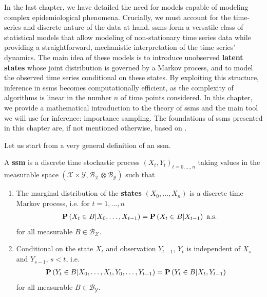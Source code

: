 In the last chapter, we have detailed the need for models capable of modeling complex epidemiological phenomena. Crucially, we must account for the time-series and discrete nature of the data at hand. 
\Glspl{ssm} form a versatile class of statistical models that allow modeling of non-stationary time series data while providing a straightforward, mechanistic interpretation of the time series' dynamics.
The main idea of these models is to introduce unobserved \textbf{latent states} whose joint distribution is governed by a Markov process, and to model the observed time series conditional on these states.
By exploiting this structure, inference in \glspl{ssm} becomes computationally efficient, as the complexity of algorithms is linear in the number $n$ of time points considered. 
In this chapter, we provide a mathematical introduction to the theory of \glspl{ssm} and the main tool we will use for inference: importance sampling. 
The foundations of \glspl{ssm} presented in this chapter are, if not mentioned otherwise, based on \citep{Durbin2012Time,Chopin2020Introduction}.

Let us start from a very general definition of an \gls{ssm}.

\begin{definition}
    \label{def:ssm}
    A \textbf{\acrlong{ssm}} is a discrete time stochastic process $(X_t, Y_t)_{t=0, \dots, n}$ taking values in the measurable space $\left(\mathcal X \times \mathcal Y, \mathcal B_{\mathcal X} \otimes \mathcal B_{\mathcal Y}\right)$ such that
    \begin{enumerate}
        \item The marginal distribution of the \textbf{states} $(X_0, \dots, X_{n})$ is a discrete time Markov process, i.e. for $t = 1, \dots, n$
              \begin{align}
                  \label{eq:markov_property}
                  \P \left( X_{t} \in B \middle| X_0, \dots, X_{t - 1} \right) = \P \left( X_{t} \in B \middle| X_{t - 1} \right) \text{ a.s.}
              \end{align}
              for all measurable $B \in \mathcal B_{\mathcal X}$.
        \item Conditional on the state $X_t$ and observation $Y_{t - 1}$, $Y_t$ is independent of $X_s$ and $Y_{s - 1}$, $s < t$, i.e.
              \begin{align*}
                  \P \left( Y_{t} \in B \middle| X_{0}, \dots, X_{t}, Y_{0}, \dots, Y_{t - 1} \right) & = \P \left( Y_{t} \in B | X_{t}, Y_{t - 1} \right)
              \end{align*}
              for all measurable $B \in \mathcal B _{\mathcal Y}$.
    \end{enumerate}
\end{definition}


